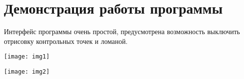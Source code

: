 \graphicspath{{png/}}

\section{Демонстрация работы программы}

Интерфейс программы очень простой, предусмотрена возможность выключить отрисовку контрольных точек и ломаной.

\texttt{[image: img1]}

\texttt{[image: img2]}
\pagebreak
